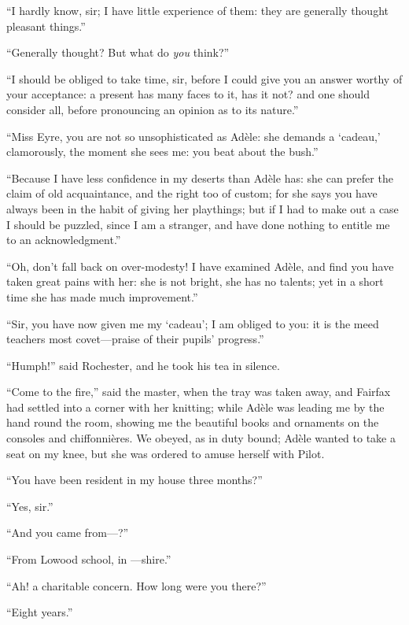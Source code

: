 \enquote{I hardly know, sir; I have little experience of them: they are
	generally thought pleasant things.}

\enquote{Generally thought? But what do \emph{you} think?}

\enquote{I should be obliged to take time, sir, before I could give you
	an answer worthy of your acceptance: a present has many faces to it, has
	it not? and one should consider all, before pronouncing an opinion as to
	its nature.}

\enquote{Miss Eyre, you are not so unsophisticated as Adèle: she demands
	a \foreignquote{french}{cadeau,} clamorously, the moment she sees me: you beat about
	the bush.}

\enquote{Because I have less confidence in my deserts than Adèle has:
	she can prefer the claim of old acquaintance, and the right too of
	custom; for she says you have always been in the habit of giving her
	playthings; but if I had to make out a case I should be puzzled, since I
	am a stranger, and have done nothing to entitle me to an
	acknowledgment.}

\enquote{Oh, don't fall back on over-modesty! I have examined Adèle,
	and find you have taken great pains with her: she is not bright, she has
	no talents; yet in a short time she has made much improvement.}

\enquote{Sir, you have now given me my \foreignquote{french}{cadeau}; I am obliged
	to you: it is the meed teachers most covet---praise of their pupils'
	progress.}

\enquote{Humph!} said \Mr{} Rochester, and he took his tea in silence.

\enquote{Come to the fire,} said the master, when the tray was taken
away, and \Mrs{} Fairfax had settled into a corner with her knitting;
while Adèle was leading me by the hand round the room, showing me the
beautiful books and ornaments on the consoles and chiffonnières. We
obeyed, as in duty bound; Adèle wanted to take a seat on my knee, but
she was ordered to amuse herself with Pilot.

\enquote{You have been resident in my house three months?}

\enquote{Yes, sir.}

\enquote{And you came from---?}

\enquote{From Lowood school, in ---shire.}

\enquote{Ah! a charitable concern. How long were you there?}

\enquote{Eight years.}

